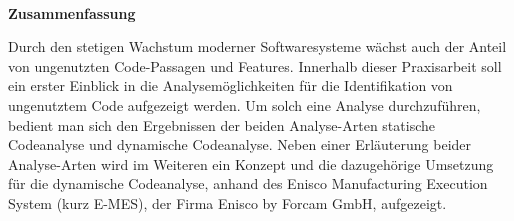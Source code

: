 
~

\vspace{17.1mm}

\begin{flushleft}
    \textbf{\huge{}Zusammenfassung}{\huge\par}
\par\end{flushleft}

Durch den stetigen Wachstum moderner Softwaresysteme wächst auch der Anteil von ungenutzten Code-Passagen und Features. Innerhalb dieser Praxisarbeit soll ein erster Einblick in die Analysemöglichkeiten für die Identifikation von ungenutztem Code aufgezeigt werden. Um solch eine Analyse durchzuführen, bedient man sich den Ergebnissen der beiden Analyse-Arten \glqq statische Codeanalyse\grqq{} und \glqq dynamische Codeanalyse\grqq{}. Neben einer Erläuterung beider Analyse-Arten wird im Weiteren ein Konzept und die dazugehörige Umsetzung für die dynamische Codeanalyse, anhand des Enisco Manufacturing Execution System (kurz E-MES), der Firma Enisco by Forcam GmbH, aufgezeigt.
